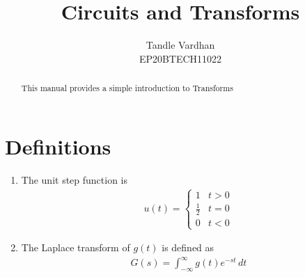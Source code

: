 \documentclass[journal,12pt,twocolumn]{IEEEtran}
\renewcommand\thesection{\arabic{section}}
\begin{document}
	\let\StandardTheFigure\thefigure
	\renewcommand{\thefigure}{\theproblem}
	\renewcommand{\thefigure}{\arabic{section}.\arabic{figure}}
	\makeatletter
	\makeatother
	
	
	\def\putbox#1#2#3{\makebox[0in][l]{\makebox[#1][l]{}\raisebox{\baselineskip}[0in][0in]{\raisebox{#2}[0in][0in]{#3}}}}
	\def\rightbox#1{\makebox[0in][r]{#1}}
	\def\centbox#1{\makebox[0in]{#1}}
	\def\topbox#1{\raisebox{-\baselineskip}[0in][0in]{#1}}
	\def\midbox#1{\raisebox{-0.5\baselineskip}[0in][0in]{#1}}
	
	\vspace{3cm}
	
	\title{ 
		Circuits and Transforms
	}
	
	\author{Tandle Vardhan\\EP20BTECH11022}
	
	\maketitle
	
	
	\tableofcontents
	
	
	\renewcommand{\thefigure}{\theenumi}
	\renewcommand{\thetable}{\theenumi}
	
	
	
	\bigskip
	
	\begin{abstract}
		This manual provides a simple introduction to Transforms
	\end{abstract}
	
	\section{Definitions}
	\begin{enumerate}[label=\arabic*.,ref=\thesection.\theenumi]
		\item The unit step function is 
		\begin{align}
			u(t) =
			\begin{cases}
				1 & t > 0
				\\
				\frac{1}{2} & t = 0
				\\
				0 & t < 0
			\end{cases}
		\end{align}
		\item The Laplace transform of $g(t)$ is defined as 
		\begin{align}
			G(s) = \int_{-\infty}^{\infty} g(t) e^{-st}\, dt
		\end{align}
	\end{enumerate}
	
\end{document}
